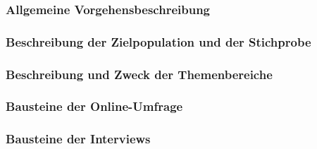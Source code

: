 \documentclass[../../main.tex]{subfiles}
\begin{document}
\subsubsection{Allgemeine Vorgehensbeschreibung}
\label{allgemeine_vorgehensbeschreibung_empirik}


\subsubsection{Beschreibung der Zielpopulation und der Stichprobe}
\label{beschreibung_zielpopulation}


\subsubsection{Beschreibung und Zweck der Themenbereiche}
\label{beschreibung_themenbereiche}


\subsubsection{Bausteine der Online-Umfrage}
\label{bausteine_onlineumfrage}


\subsubsection{Bausteine der Interviews}
\label{bausteine_interviews}

\end{document}
